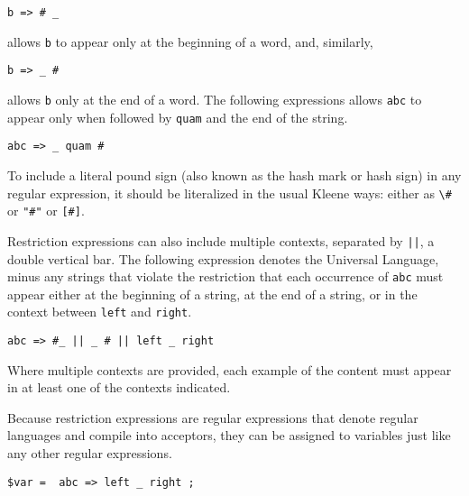 \begin{Verbatim}
b => # _
\end{Verbatim}

\noindent
allows \texttt{b} to appear only at the beginning of a word, and,
similarly,

\begin{Verbatim}
b => _ #
\end{Verbatim}

\noindent
allows \texttt{b} only at the end of a word.  The following
expressions allows \texttt{abc} to appear only when followed by
\texttt{quam} and the end of the string.

\begin{Verbatim}
abc => _ quam #
\end{Verbatim}

\noindent
To include a literal pound sign (also known as the hash mark or
hash sign) in any regular expression, it should be literalized in
the usual Kleene ways:  either as \verb!\#! or \verb!"#"! or \verb![#]!. 

Restriction expressions can also include multiple contexts, separated by
\texttt{||}, a double vertical bar.  The following expression denotes the
Universal Language, minus any strings that violate the restriction that
each occurrence of \texttt{abc} must appear either at the beginning of a
string, at the end of a string, or in the context between \texttt{left}
and \texttt{right}.

\begin{Verbatim}
abc => #_ || _ # || left _ right 
\end{Verbatim}

\noindent
Where multiple contexts are provided, each example of the content
must appear in at least one of the contexts indicated.

Because restriction expressions are regular expressions that denote
regular languages and compile into acceptors, they can be assigned to
variables just like any other regular expressions.

\begin{Verbatim}
$var =  abc => left _ right ;
\end{Verbatim}



